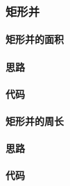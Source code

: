 \subsubsection{矩形并}
	\paragraph{矩形并的面积}
	
	\paragraph{思路}
	
	\paragraph{代码}
	
	\paragraph{矩形并的周长}
	
	\paragraph{思路}
	
	\paragraph{代码}